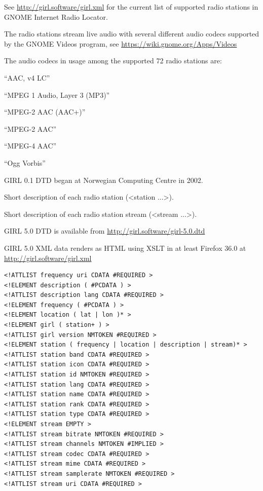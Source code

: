 \documentclass[20pt,landscape]{foils}
\begin{document}
See \url{http://girl.software/girl.xml} for the current list of supported
radio stations in GNOME Internet Radio Locator.


The radio stations stream live audio with several different audio
codecs supported by the GNOME Videos program, see \url{https://wiki.gnome.org/Apps/Videos}

The audio codecs in usage among the supported 72 radio stations are:

\begin{list1}
  \item
    \begin{list2}
    \item ``AAC, v4 LC''
    \item ``MPEG 1 Audio, Layer 3 (MP3)''
    \item ``MPEG-2 AAC (AAC+)''
    \item ``MPEG-2 AAC''
    \item ``MPEG-4 AAC''
    \item ``Ogg Vorbis''
    \end{list2}
\end{list1}


\begin{list1}
\item GIRL 0.1 DTD began at Norwegian Computing Centre in 2002.
\item Short description of each radio station (<station ...>).
\item Short description of each radio station stream (<stream ...>).
\item GIRL 5.0 DTD is available from \url{http://girl.software/girl-5.0.dtd}
\item GIRL 5.0 XML data renders as HTML using XSLT in at least Firefox 36.0 at \url{http://girl.software/girl.xml}
\end{list1}


\begin{tiny}
\begin{verbatim}
<!ATTLIST frequency uri CDATA #REQUIRED >
<!ELEMENT description ( #PCDATA ) >
<!ATTLIST description lang CDATA #REQUIRED >
<!ELEMENT frequency ( #PCDATA ) >
<!ELEMENT location ( lat | lon )* >
<!ELEMENT girl ( station+ ) >
<!ATTLIST girl version NMTOKEN #REQUIRED >
<!ELEMENT station ( frequency | location | description | stream)* >
<!ATTLIST station band CDATA #REQUIRED >
<!ATTLIST station icon CDATA #REQUIRED >
<!ATTLIST station id NMTOKEN #REQUIRED >
<!ATTLIST station lang CDATA #REQUIRED >
<!ATTLIST station name CDATA #REQUIRED >
<!ATTLIST station rank CDATA #REQUIRED >
<!ATTLIST station type CDATA #REQUIRED >
<!ELEMENT stream EMPTY >
<!ATTLIST stream bitrate NMTOKEN #REQUIRED >
<!ATTLIST stream channels NMTOKEN #IMPLIED >
<!ATTLIST stream codec CDATA #REQUIRED >
<!ATTLIST stream mime CDATA #REQUIRED >
<!ATTLIST stream samplerate NMTOKEN #REQUIRED >
<!ATTLIST stream uri CDATA #REQUIRED >
\end{verbatim}
\end{tiny}
\end{document}
